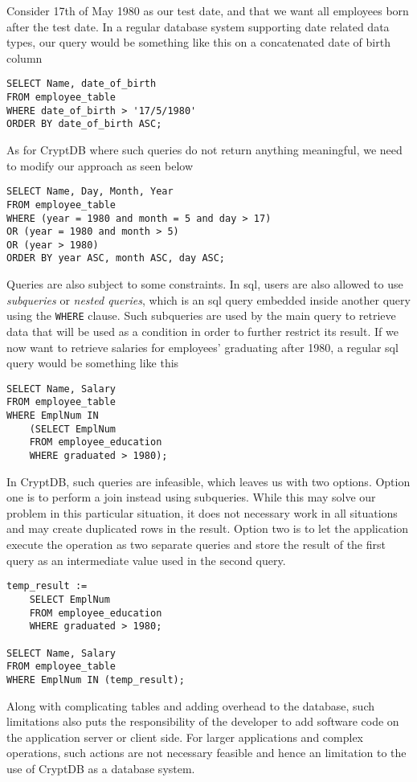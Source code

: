 Consider 17th of May 1980 as our test date, and that we want all employees born after the test date. In a regular database system supporting date related data types, our query would be something like this on a concatenated date of birth column

\begin{verbatim}
SELECT Name, date_of_birth
FROM employee_table
WHERE date_of_birth > '17/5/1980'
ORDER BY date_of_birth ASC;
\end{verbatim}

As for CryptDB where such queries do not return anything meaningful, we need to modify our approach as seen below

\begin{verbatim}
SELECT Name, Day, Month, Year
FROM employee_table
WHERE (year = 1980 and month = 5 and day > 17)
OR (year = 1980 and month > 5)
OR (year > 1980)
ORDER BY year ASC, month ASC, day ASC;
\end{verbatim}

Queries are also subject to some constraints. In \gls{sql}, users are also allowed to use \emph{subqueries} or \emph{nested queries}, which is an \gls{sql} query embedded inside another query using the \verb!WHERE! clause. Such subqueries are used by the main query to retrieve data that will be used as a condition in order to further restrict its result. If we now want to retrieve salaries for employees' graduating after 1980, a regular \gls{sql} query would be something like this

\begin{verbatim}
SELECT Name, Salary
FROM employee_table
WHERE EmplNum IN
    (SELECT EmplNum
    FROM employee_education
    WHERE graduated > 1980);
\end{verbatim}

In CryptDB, such queries are infeasible, which leaves us with two options. Option one is to perform a join instead using subqueries. While this may solve our problem in this particular situation, it does not necessary work in all situations and may create duplicated rows in the result. Option two is to let the application execute the operation as two separate queries and store the result of the first query as an intermediate value used in the second query.

\begin{verbatim}
temp_result :=
    SELECT EmplNum
    FROM employee_education
    WHERE graduated > 1980;

SELECT Name, Salary
FROM employee_table 
WHERE EmplNum IN (temp_result);
\end{verbatim}


Along with complicating tables and adding overhead to the database, such limitations also puts the responsibility of the developer to add software code on the application server or client side. For larger applications and complex operations, such actions are not necessary feasible and hence an limitation to the use of CryptDB as a database system.\\